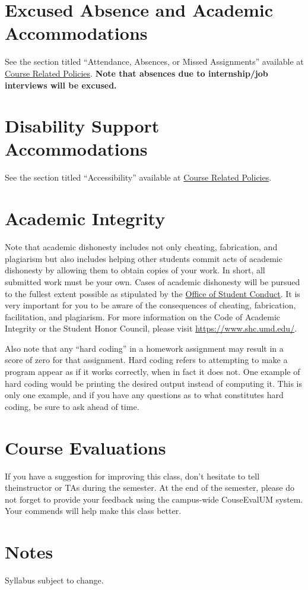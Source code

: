 \documentclass[12pt]{article}
\begin{document}
\section*{Excused Absence and Academic Accommodations}
See the section titled ``Attendance, Absences, or Missed Assignments'' available at \href{https://www.ugst.umd.edu/courserelatedpolicies.html}{Course Related Policies}.
\textbf{Note that absences due to internship/job interviews will be excused.}

\section*{Disability Support Accommodations}
See the section titled ``Accessibility'' available at \href{https://www.ugst.umd.edu/courserelatedpolicies.html}{Course Related Policies}.

\section*{Academic Integrity}
Note that academic dishonesty includes not only cheating, fabrication, and plagiarism but also includes helping other students commit acts of academic dishonesty by allowing them to obtain copies of your work.
In short, all submitted work must be your own.
Cases of academic dishonesty will be pursued to the fullest extent possible as stipulated by the \href{https://www.studentconduct.umd.edu/}{Office of Student Conduct}.
It is very important for you to be aware of the consequences of cheating, fabrication, facilitation, and plagiarism.
For more information on the Code of Academic Integrity or the Student Honor Council, please visit \href{https://www.shc.umd.edu/}{https://www.shc.umd.edu/}.

Also note that any ``hard coding'' in a homework assignment may result in a score of zero for that assignment. Hard coding refers to attempting to make a program appear as if it works correctly, when in fact it does not. One example of hard coding would be printing the desired output instead of computing it. This is only one example, and if you have any questions as to what constitutes hard coding, be sure to ask ahead of time.

\section*{Course Evaluations}
If you have a suggestion for improving this class, don't hesitate to tell theinstructor or TAs during the semester.
At the end of the semester, please do not forget to provide your feedback using the campus-wide CouseEvalUM system. Your commends will help make this class better.

\section*{Notes}
Syllabus subject to change.
\end{document}
